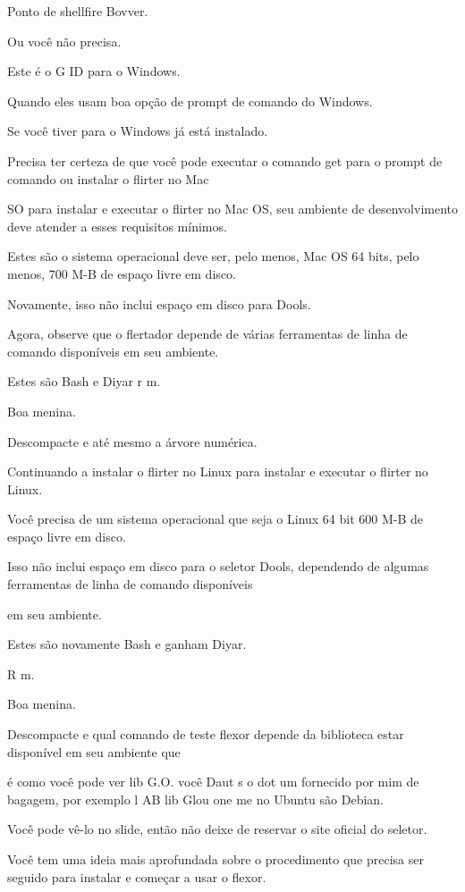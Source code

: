 Ponto de shellfire Bovver.

Ou você não precisa.

Este é o G ID para o Windows.

Quando eles usam boa opção de prompt de comando do Windows.

Se você tiver para o Windows já está instalado.

Precisa ter certeza de que você pode executar o comando get para o prompt de comando ou instalar o flirter no Mac

SO para instalar e executar o flirter no Mac OS, seu ambiente de desenvolvimento deve atender a esses requisitos mínimos.

Estes são o sistema operacional deve ser, pelo menos, Mac OS 64 bits, pelo menos, 700 M-B de espaço livre em disco.

Novamente, isso não inclui espaço em disco para Dools.

Agora, observe que o flertador depende de várias ferramentas de linha de comando disponíveis em seu ambiente.

Estes são Bash e Diyar r m.

Boa menina.

Descompacte e até mesmo a árvore numérica.

Continuando a instalar o flirter no Linux para instalar e executar o flirter no Linux.

Você precisa de um sistema operacional que seja o Linux 64 bit 600 M-B de espaço livre em disco.

Isso não inclui espaço em disco para o seletor Dools, dependendo de algumas ferramentas de linha de comando disponíveis

em seu ambiente.

Estes são novamente Bash e ganham Diyar.

R m.

Boa menina.

Descompacte e qual comando de teste flexor depende da biblioteca estar disponível em seu ambiente que

é como você pode ver lib G.O. você Daut s o dot um fornecido por mim de bagagem, por exemplo l AB lib Glou one me no Ubuntu são Debian.

Você pode vê-lo no slide, então não deixe de reservar o site oficial do seletor.

Você tem uma ideia mais aprofundada sobre o procedimento que precisa ser seguido para instalar e começar a usar o flexor.



